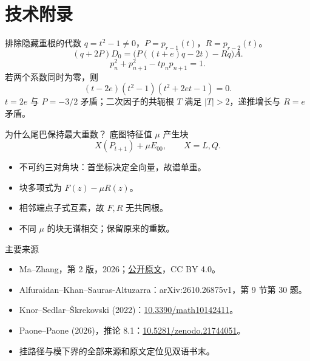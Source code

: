 \documentclass{beamer}
\begin{document}
\section{技术附录}
\begin{frame}{排除隐藏重根的代数}
\small
$q=t^2-1\ne0$，$P=p_{r-1}(t)$，$R=p_{r-2}(t)$。
\[
(q+2P)D_0=\bigl(P((t+e)q-2t)-Rq\bigr)A.
\]
\[
p_n^2+p_{n+1}^2-tp_np_{n+1}=1.
\]
若两个系数同时为零，则
\[
(t-2e)(t^2-1)(t^2+2et-1)=0.
\]
$t=2e$ 与 $P=-3/2$ 矛盾；二次因子的共轭根 $T$ 满足 $|T|>2$，递推增长与 $R=e$ 矛盾。
\end{frame}
\begin{frame}{为什么尾巴保持最大重数？}
底图特征值 $\mu$ 产生块
\[
X(P_{t+1})+\mu E_{00},\qquad X=L,Q.
\]
\begin{itemize}
\item 不可约三对角块：首坐标决定全向量，故谱单重。
\item 块多项式为 $F(z)-\mu R(z)$。
\item 相邻端点子式互素，故 $F,R$ 无共同根。
\item 不同 $\mu$ 的块无谱相交；保留原来的重数。
\end{itemize}
\end{frame}
\begin{frame}{主要来源}
\footnotesize
\begin{itemize}
\item Ma--Zhang，第 2 版，2026；\href{https://mathesis-omega-research.apps.chrono-ai.fun/papers/aks2610-twin-free-theta-separation?version=2}{公开原文}，CC BY 4.0。
\item Alfuraidan--Khan--Sauras-Altuzarra：arXiv:2610.26875v1，第 9 节第 30 题。
\item Knor--Sedlar--Škrekovski (2022)：\href{https://doi.org/10.3390/math10142411}{10.3390/math10142411}。
\item Paone--Paone (2026)，推论 8.1：\href{https://doi.org/10.5281/zenodo.21744051}{10.5281/zenodo.21744051}。
\item 挂路径与模下界的全部来源和原文定位见双语书末。
\end{itemize}
\end{frame}
\FormalVerification
\end{document}
